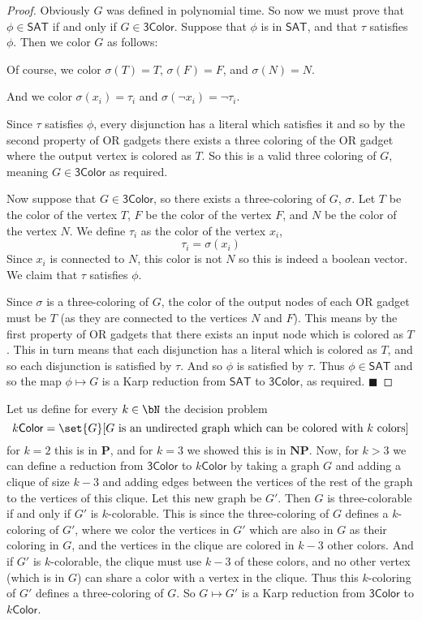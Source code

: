 \documentclass[10pt]{article}
\def\sat{\mathsf{SAT}}
\def\threecolor{\mathsf{3Color}}
\def\kcolor{k\mathsf{Color}}
\def\P{\mathbf{P}}
\def\NP{\mathbf{NP}}
\def\qed{%
    \ifmmode%
        \eqno\blacksquare%
    \else%
        \hskip1cm\allowbreak\hbox{}\nobreak\hfill$\blacksquare$%
    \fi%
}
\begin{document}
\begin{proof}
    Obviously $G$ was defined in polynomial time.
    So now we must prove that $\phi\in\sat$ if and only if $G\in\threecolor$.
    Suppose that $\phi$ is in $\sat$, and that $\tau$ satisfies $\phi$.
    Then we color $G$ as follows:
    \benum
        \item Of course, we color $\sigma(T)=T$, $\sigma(F)=F$, and $\sigma(N)=N$.
        \item And we color $\sigma(x_i)=\tau_i$ and $\sigma(\neg x_i)=\neg\tau_i$.
        \item Since $\tau$ satisfies $\phi$, every disjunction has a literal which satisfies it and so by the second property of OR gadgets there exists a three coloring of the OR gadget where the output
        vertex is colored as $T$.
    \eenum
    So this is a valid three coloring of $G$, meaning $G\in\threecolor$ as required.

    Now suppose that $G\in\threecolor$, so there exists a three-coloring of $G$, $\sigma$.
    Let $T$ be the color of the vertex $T$, $F$ be the color of the vertex $F$, and $N$ be the color of the vertex $N$.
    We define $\tau_i$ as the color of the vertex $x_i$,
    \[ \tau_i = \sigma(x_i) \]
    Since $x_i$ is connected to $N$, this color is not $N$ so this is indeed a boolean vector.
    We claim that $\tau$ satisfies $\phi$.

    Since $\sigma$ is a three-coloring of $G$, the color of the output nodes of each OR gadget must be $T$ (as they are connected to the vertices $N$ and $F$).
    This means by the first property of OR gadgets that there exists an input node which is colored as $T$.
    This in turn means that each disjunction has a literal which is colored as $T$, and so each disjunction is satisfied by $\tau$.
    And so $\phi$ is satisfied by $\tau$.
    Thus $\phi\in\sat$ and so the map $\phi\mapsto G$ is a Karp reduction from $\sat$ to $\threecolor$, as required.
    \qed

\end{proof}

Let us define for every $k\in\bN$ the decision problem
\[ \kcolor = \set{G}[\text{$G$ is an undirected graph which can be colored with $k$ colors}] \]
for $k=2$ this is in $\P$, and for $k=3$ we showed this is in $\NP$.
Now, for $k>3$ we can define a reduction from $\threecolor$ to $\kcolor$ by taking a graph $G$ and adding a clique of size $k-3$ and adding edges between the vertices of the rest of the graph to the vertices
of this clique.
Let this new graph be $G'$.
Then $G$ is three-colorable if and only if $G'$ is $k$-colorable.
This is since the three-coloring of $G$ defines a $k$-coloring of $G'$, where we color the vertices in $G'$ which are also in $G$ as their coloring in $G$, and the vertices in the clique are colored in
$k-3$ other colors.
And if $G'$ is $k$-colorable, the clique must use $k-3$ of these colors, and no other vertex (which is in $G$) can share a color with a vertex in the clique.
Thus this $k$-coloring of $G'$ defines a three-coloring of $G$.
So $G\mapsto G'$ is a Karp reduction from $\threecolor$ to $\kcolor$.
\end{document}
